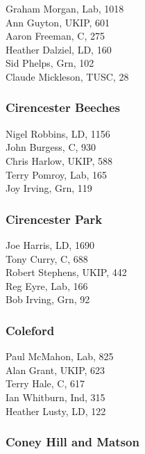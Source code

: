 \documentclass[a4paper,openany,10pt]{book}
\begin{document}
Graham Morgan, Lab, 1018\\
Ann Guyton, UKIP, 601\\
Aaron Freeman, C, 275\\
Heather Dalziel, LD, 160\\
Sid Phelps, Grn, 102\\
Claude Mickleson, TUSC, 28\\


\subsubsection*{Cirencester Beeches}



Nigel Robbins, LD, 1156\\
John Burgess, C, 930\\
Chris Harlow, UKIP, 588\\
Terry Pomroy, Lab, 165\\
Joy Irving, Grn, 119\\


\subsubsection*{Cirencester Park}



Joe Harris, LD, 1690\\
Tony Curry, C, 688\\
Robert Stephens, UKIP, 442\\
Reg Eyre, Lab, 166\\
Bob Irving, Grn, 92\\


\subsubsection*{Coleford}



Paul McMahon, Lab, 825\\
Alan Grant, UKIP, 623\\
Terry Hale, C, 617\\
Ian Whitburn, Ind, 315\\
Heather Lusty, LD, 122\\


\subsubsection*{Coney Hill and Matson}
\end{document}
